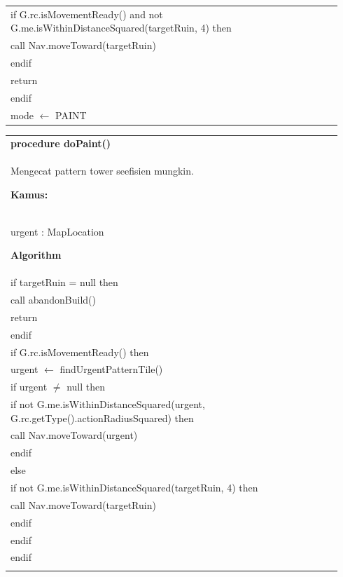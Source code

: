 \documentclass{article}
\newenvironment{pseudobox}
{
\centering
\begin{longtable}{|p{0.94\linewidth}|}
\hline
}
{
\\ \hline
\end{longtable}
\vspace{0.05cm}
}
\begin{document}
\begin{pseudobox}
\hspace*{2em} if G.rc.isMovementReady() and not G.me.isWithinDistanceSquared(targetRuin, 4) then \\
\hspace*{3em} call Nav.moveToward(targetRuin) \\
\hspace*{2em} endif \\
\hspace*{2em} return \\
\hspace*{1em} endif \\

\hspace*{1em} mode $\leftarrow$ PAINT
\end{pseudobox}

\begin{pseudobox}
\textbf{procedure doPaint()} \\
{ Mengecat pattern tower seefisien mungkin. }

\textbf{Kamus:} \\
\hspace*{1em} urgent : MapLocation

\textbf{Algorithm} \\
\hspace*{1em} if targetRuin = null then \\
\hspace*{2em} call abandonBuild() \\
\hspace*{2em} return \\
\hspace*{1em} endif \\

\hspace*{1em} if G.rc.isMovementReady() then \\
\hspace*{2em} urgent $\leftarrow$ findUrgentPatternTile() \\
\hspace*{2em} if urgent $\neq$ null then \\
\hspace*{3em} if not G.me.isWithinDistanceSquared(urgent, G.rc.getType().actionRadiusSquared) then \\
\hspace*{4em} call Nav.moveToward(urgent) \\
\hspace*{3em} endif \\
\hspace*{2em} else \\
\hspace*{3em} if not G.me.isWithinDistanceSquared(targetRuin, 4) then \\
\hspace*{4em} call Nav.moveToward(targetRuin) \\
\hspace*{3em} endif \\
\hspace*{2em} endif \\
\hspace*{1em} endif \\


\end{pseudobox}
\end{document}

